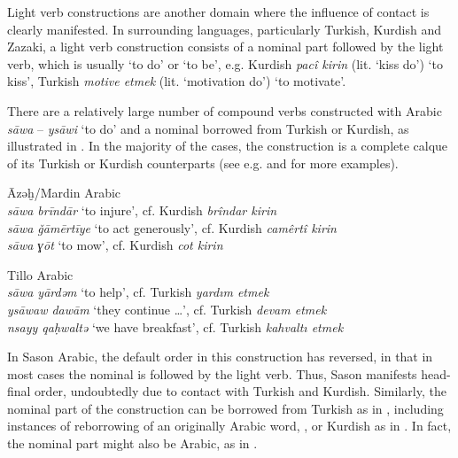 \documentclass[output=paper]{langsci/langscibook}
\begin{document}
Light verb constructions are another domain where the influence of contact is clearly manifested. In surrounding languages, particularly Turkish, Kurdish and Zazaki, a light verb construction consists of a nominal part followed by the light verb, which is usually `to do' or `to be', e.g. Kurdish \textit{pacî kirin} (lit. `kiss do') `to kiss', Turkish \textit{motive etmek} (lit. `motivation do') `to motivate’. 

There are a relatively large number of compound verbs constructed with Arabic \textit{s\={a}wa} – \textit{ys\={a}wi} `to do' and a nominal borrowed from Turkish or Kurdish, as illustrated in . In the majority of the cases, the construction is a complete calque of its Turkish or Kurdish counterparts (see e.g. \citealt{Versteegh1997,Lahdo2009,Grigore2007article,Talay2007,Jastrow2011anatolian,Akkus2016,Akkus2017,AkkusBenmamoun2018} and \citealt{Bituna2016} for more examples).


\begin{exe}
\ex \label{light}  
		\begin{xlist}
		\ex Āzəḫ/Mardin Arabic \citep[184]{Talay2007}\\ \textit{s\={a}wa brīndār} `to injure',	cf. Kurdish \textit{brîndar kirin}\\
\textit{s\={a}wa \v{g}āmērtīye} `to act generously', cf. Kurdish \textit{camêrtî kirin}\\
\textit{s\={a}wa ɣōt} `to mow', cf. Kurdish  \textit{cot kirin}


	\ex \label{com3} Tillo Arabic \citep[202]{Lahdo2009}\\ \textit{s\={a}wa yārdəm} `to help', cf. Turkish \textit{yardım etmek}\\
\textit{ys\={a}waw dawām} `they continue …', cf.  Turkish \textit{devam etmek}\\
\textit{nsayy qa\d{h}waltə} `we have breakfast', cf. Turkish \textit{kahvalt{\i} etmek}
		\end{xlist}
		
\end{exe}


\noindent In Sason Arabic, the default order in this construction has reversed, in that in most cases the nominal is followed by the light verb. Thus, Sason manifests head-final order, undoubtedly due to contact with Turkish and Kurdish. Similarly, the nominal part of the construction can be borrowed from Turkish as in , including instances of reborrowing of an originally Arabic word, , or Kurdish as in . In fact, the nominal part might also be Arabic, as in . 
\end{document}

